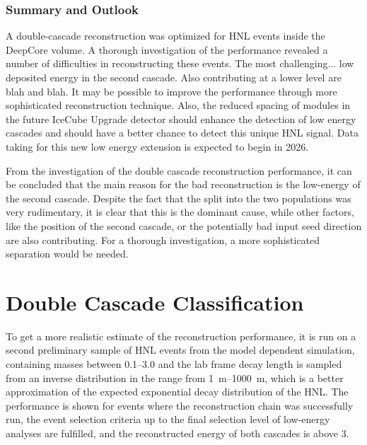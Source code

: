 

\subsubsection{Summary and Outlook}

A double-cascade reconstruction was optimized for HNL events inside the DeepCore volume. A thorough investigation of the performance revealed a number of difficulties in reconstructing these events. The most challenging... low deposited energy in the second cascade. Also contributing at a lower level are blah and blah. It may be possible to improve the performance through more sophisticated reconstruction technique. Also, the reduced spacing of modules in the future IceCube Upgrade detector should enhance the detection of low energy cascades and should have a better chance to detect this unique HNL signal. Data taking for this new low energy extension is expected to begin in 2026.

From the investigation of the double cascade reconstruction performance, it can be concluded that the main reason for the bad reconstruction is the low-energy of the second cascade. Despite the fact that the split into the two populations was very rudimentary, it is clear that this is the dominant cause, while other factors, like the position of the second cascade, or the potentially bad input seed direction are also contributing. For a thorough investigation, a more sophisticated separation would be needed.


\section{Double Cascade Classification} 


To get a more realistic estimate of the reconstruction performance, it is run on a second preliminary sample of HNL events from the model dependent simulation, containing masses between \SIrange[range-phrase=~and~]{0.1}{3.0}{\gev} and the lab frame decay length is sampled from an inverse distribution in the range from \SIrange{1}{1000}{\meter}, which is a better approximation of the expected exponential decay distribution of the HNL. The performance is shown for events where the reconstruction chain was successfully run, the event selection criteria up to the final selection level of low-energy analyses are fulfilled, and the reconstructed energy of both cascades is above \SI{3}{\gev}.


